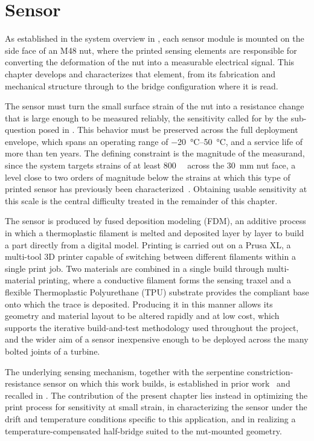 \chapter{Sensor} \label{sec:Sensor}
As established in the system overview in , each sensor module is mounted on the side face of an M48 nut, where the printed sensing elements are responsible for converting the deformation of the nut into a measurable electrical signal. This chapter develops and characterizes that element, from its fabrication and mechanical structure through to the bridge configuration where it is read.

The sensor must turn the small surface strain of the nut into a resistance change that is large enough to be measured reliably, the sensitivity called for by the sub-question posed in . This behavior must be preserved across the full deployment envelope, which spans an operating range of \SIrange{-20}{50}{\celsius}, and a service life of more than ten years. The defining constraint is the magnitude of the measurand, since the system targets strains of at least \SI{800}{\micro\strain} across the \SI{30}{\milli\meter} nut face, a level close to two orders of magnitude below the strains at which this type of printed sensor has previously been characterized~\cite{G.O.A.T}. Obtaining usable sensitivity at this scale is the central difficulty treated in the remainder of this chapter.

The sensor is produced by fused deposition modeling (FDM), an additive process in which a thermoplastic filament is melted and deposited layer by layer to build a part directly from a digital model. Printing is carried out on a Prusa XL, a multi-tool 3D printer capable of switching between different filaments within a single print job. Two materials are combined in a single build through multi-material printing, where a conductive filament forms the sensing traxel and a flexible Thermoplastic Polyurethane (TPU) substrate provides the compliant base onto which the trace is deposited. Producing it in this manner allows its geometry and material layout to be altered rapidly and at low cost, which supports the iterative build-and-test methodology used throughout the project, and the wider aim of a sensor inexpensive enough to be deployed across the many bolted joints of a turbine.
 
The underlying sensing mechanism, together with the serpentine constriction-resistance sensor on which this work builds, is established in prior work~\cite{G.O.A.T} and recalled in . The contribution of the present chapter lies instead in optimizing the print process for sensitivity at small strain, in characterizing the sensor under the drift and temperature conditions specific to this application, and in realizing a temperature-compensated half-bridge suited to the nut-mounted geometry.

